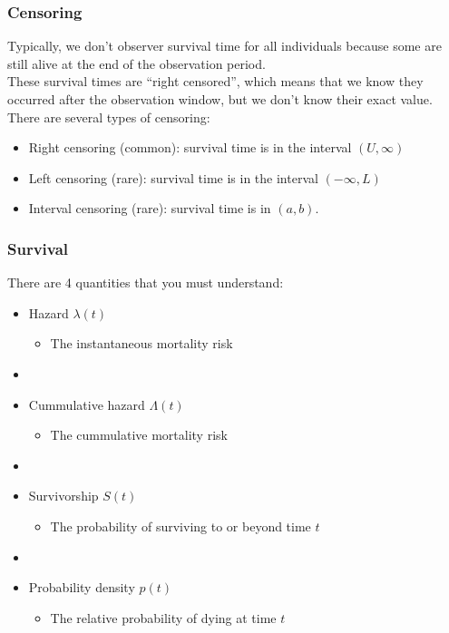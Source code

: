 \documentclass[color=usenames,dvipsnames]{beamer}\usepackage[]{graphicx}\usepackage[]{color}
\begin{document}
\begin{frame}
  \frametitle{Censoring}
  Typically, we don't observer survival time for all individuals
  because some are still alive at the end of the observation period. \\
  \pause
  \vfill
  These survival times are ``right censored'', which means that we
  know they occurred after the observation window, but we don't know
  their exact value. \\
  \pause
  \vfill
  There are several types of censoring: 
  \begin{itemize}%
    \small
    \item Right censoring (common): survival time is in the interval $(U,\infty)$
    \item Left censoring (rare): survival time is in the interval
      $(-\infty,L)$
    \item Interval censoring (rare): survival time is in $(a,b)$. 
  \end{itemize}  
\end{frame}





\begin{frame}
  \frametitle{Survival}
  \large
  There are 4 quantities that you must understand:
  \vfill
  \begin{itemize}%
    \item<1-> Hazard $\lambda(t)$
      \begin{itemize}
        \item The instantaneous mortality risk
      \end{itemize}
    \item[]
    \item<2-> Cummulative hazard $\Lambda(t)$
      \begin{itemize}
        \item The cummulative mortality risk
      \end{itemize}
    \item[]
    \item<3-> Survivorship $S(t)$
      \begin{itemize}
        \item The probability of surviving to or beyond time $t$
      \end{itemize}
    \item[]
    \item<4-> Probability density $p(t)$
      \begin{itemize}
        \item The relative probability of dying at time $t$
      \end{itemize}
  \end{itemize}
\end{frame}
\end{document}
